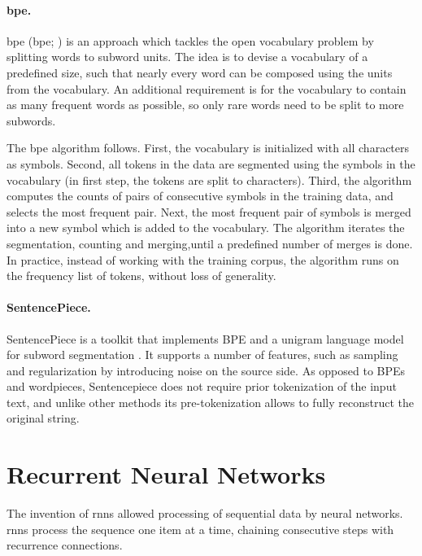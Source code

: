 \paragraph{\acrshort{bpe}.}  \Acrlong{bpe} (\acrshort{bpe};
\citealp{sennrich2016bpe}) is an approach which tackles the open vocabulary
problem by splitting words to subword units.  The idea is to devise a vocabulary
of a predefined size, such that nearly every word can be composed using the
units from the vocabulary. An additional requirement is for the vocabulary to
contain as many frequent words as possible, so only rare words need to be split
to more subwords.

The \gls{bpe} algorithm %
follows. First, the vocabulary is initialized with all characters as
symbols. Second, all tokens in the data are segmented using the symbols in the
vocabulary (in first step, the tokens are split to characters).  Third, the
algorithm computes the counts of pairs of consecutive symbols in the training
data, and selects the most frequent pair. Next, the most frequent pair of
symbols is merged into a new symbol which is added to the vocabulary. The
algorithm iterates the segmentation, counting and merging,until a predefined
number of merges is done. In practice, instead of working with the training
corpus, the algorithm runs on the frequency list of tokens, without loss of
generality.

\paragraph{SentencePiece.}   SentencePiece
\citep{kudo2018sentencepiece} is a toolkit that implements BPE and a unigram
language model for subword segmentation \citep{kudo-2018-subword}. It supports a
number of features, such as sampling and regularization by introducing noise on
the source side. As opposed to BPEs and wordpieces, Sentencepiece does not
require prior tokenization of the input text, and unlike other methods its
pre-tokenization allows to fully reconstruct the original string.



\section{Recurrent Neural Networks}
\label{sec:rnn}

The invention of \glspl{rnn} \citep{elman1990finding} allowed processing of
sequential data by neural networks. \Glspl{rnn} process the sequence one item at
a time, chaining consecutive steps with recurrence connections.

